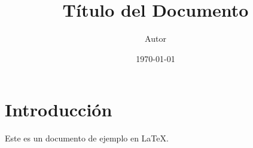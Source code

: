 \documentclass{article}
\begin{document}
\title{Título del Documento}
\author{Autor}
\date{\today}

\maketitle

\section{Introducción}
Este es un documento de ejemplo en LaTeX.
\end{document}
